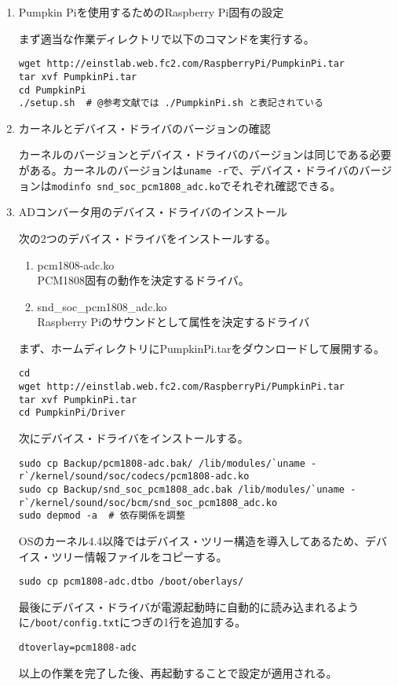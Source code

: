 \begin{enumerate}
\def\labelenumi{\arabic{enumi}.}
\item
  Pumpkin Piを使用するためのRaspberry Pi固有の設定

  まず適当な作業ディレクトリで以下のコマンドを実行する。

\begin{verbatim}
wget http://einstlab.web.fc2.com/RaspberryPi/PumpkinPi.tar
tar xvf PumpkinPi.tar
cd PumpkinPi
./setup.sh  # @参考文献では ./PumpkinPi.sh と表記されている
\end{verbatim}
\item
  カーネルとデバイス・ドライバのバージョンの確認

  カーネルのバージョンとデバイス・ドライバのバージョンは同じである必要がある。カーネルのバージョンは\texttt{uname\ -r}で、デバイス・ドライバのバージョンは\texttt{modinfo\ snd\_soc\_pcm1808_adc.ko}でそれぞれ確認できる。
\item
  ADコンバータ用のデバイス・ドライバのインストール

  次の2つのデバイス・ドライバをインストールする。

  \begin{enumerate}
  \def\labelenumii{\arabic{enumii}.}
  \tightlist
  \item
    pcm1808-adc.ko\\
    PCM1808固有の動作を決定するドライバ。
  \item
    snd\_soc\_pcm1808\_adc.ko\\
    Raspberry Piのサウンドとして属性を決定するドライバ
  \end{enumerate}

  まず、ホームディレクトリにPumpkinPi.tarをダウンロードして展開する。

\begin{verbatim}
cd 
wget http://einstlab.web.fc2.com/RaspberryPi/PumpkinPi.tar
tar xvf PumpkinPi.tar
cd PumpkinPi/Driver
\end{verbatim}

  次にデバイス・ドライバをインストールする。

\begin{verbatim}
sudo cp Backup/pcm1808-adc.bak/ /lib/modules/`uname -r`/kernel/sound/soc/codecs/pcm1808-adc.ko
sudo cp Backup/snd_soc_pcm1808_adc.bak /lib/modules/`uname -r`/kernel/sound/soc/bcm/snd_soc_pcm1808_adc.ko
sudo depmod -a  # 依存関係を調整
\end{verbatim}

  OSのカーネル4.4以降ではデバイス・ツリー構造を導入してあるため、デバイス・ツリー情報ファイルをコピーする。

\begin{verbatim}
sudo cp pcm1808-adc.dtbo /boot/oberlays/
\end{verbatim}

  最後にデバイス・ドライバが電源起動時に自動的に読み込まれるように\texttt{/boot/config.txt}につぎの1行を追加する。

\begin{verbatim}
dtoverlay=pcm1808-adc
\end{verbatim}

  以上の作業を完了した後、再起動することで設定が適用される。
\end{enumerate}
